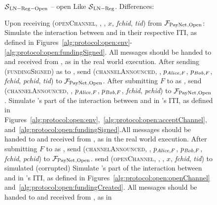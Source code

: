 \begin{figure}[!htbp]
  \begin{simulatorbox}{$\mathcal{S}{}_{\mathrm{LN - Reg - Open}}$ -- open}
    Like $\mathcal{S}{}_{\mathrm{LN - Reg}}$. Differences:
    \begin{algorithmic}[1]
      \State Upon receiving (\textsc{openChannel}, \alice, \bob, $x$,
      \textit{fchid}, \textit{tid}) from $\mathcal{F}_{\mathrm{PayNet}}{}_{\mathrm{, Open}}$:
      \Indent
          \State Simulate the interaction between \alice{} and \bob{} in their
          respective ITI, as defined in
          Figures~\ref{alg:protocol:open:env}-\ref{alg:protocol:open:fundingSigned}.
          All messages should be handed to and received from \adversary, as in
          the real world execution.
          \State After sending (\textsc{fundingSigned}) as \bob{} to \alice,
          send (\textsc{channelAnnounced}, \bob, $p_{\mathit{Alice}, F}$, $p_{\mathit{Bob}, F}$,
          \textit{fchid}, \textit{pchid}, \textit{tid}) to
          $\mathcal{F}_{\mathrm{PayNet}}{}_{\mathrm{, Open}}$.
          \label{alg:sim:open:announced:bob:bothhonest}
          \State After submitting $F$ to \ledger{} as \alice, send
          (\textsc{channelAnnounced}, \alice, $p_{\mathit{Alice}, F}$, $p_{\mathit{Bob}, F}$,
          \textit{fchid}, \textit{pchid}) to $\mathcal{F}_{\mathrm{PayNet}}{}_{\mathrm{, Open}}$.
          \label{alg:sim:open:announced:alice:bothhonest}
          \State Simulate \alice's part of the interaction between \alice{}
          and \bob{} in \alice's ITI, as defined in
          Figures~\ref{alg:protocol:open:env},~\ref{alg:protocol:open:acceptChannel},
          and~\ref{alg:protocol:open:fundingSigned}.All messages should be
          handed to and received from \adversary, as in the real world
          execution.
          \State After submitting $F$ to \ledger{} as \alice, send
          (\textsc{channelAnnounced}, \alice, $p_{\mathit{Alice}, F}$, $p_{\mathit{Bob}, F}$,
          \textit{fchid}, \textit{pchid}) to $\mathcal{F}_{\mathrm{PayNet}}{}_{\mathrm{, Open}}$.
          \label{alg:sim:open:announced:alice:alicehonest}
          \State send (\textsc{openChannel}, \alice, \bob, $x$,
          \textit{fchid}, \textit{tid}) to simulated (corrupted) \alice
          \State Simulate \bob's part of the interaction between \alice{}
          and \bob{} in \bob's ITI, as defined in
          Figures~\ref{alg:protocol:open:openChannel}
          and~\ref{alg:protocol:open:fundingCreated}.
          All messages should be handed to and received from \adversary, as in

\end{algorithmic}
\end{simulatorbox}
\end{figure}

